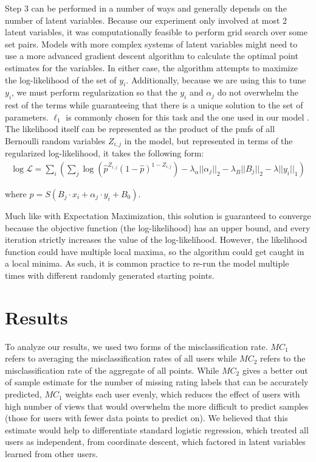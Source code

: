 \documentclass{article} %
\begin{document}
Step 3 can be performed in a number of ways and generally depends on the number of latent variables. Because our experiment only involved at most 2 latent variables, it was computationally feasible to perform grid search over some set pairs. Models with more complex systems of latent variables might need to use a more advanced gradient descent algorithm to calculate the optimal point estimates for the variables. In either case, the algorithm attempts to maximize the log-likelihood of the set of $y_i$. Additionally, because we are using this to tune $y_i$, we must perform regularization so that the $y_i$ and $\alpha_j$ do not overwhelm the rest of the terms while guaranteeing that there is a unique solution to the set of parameters. $\ell_1$ is commonly chosen for this task and the one used in our model \cite{mlapp}. The likelihood itself can be represented as the product of the pmfs of all Bernoulli random variables $Z_{i,j}$ in the model, but represented in terms of the regularized log-likelihood, it takes the following form:
\begin{align*}
\log \mathcal{L} = \sum_i \left( \sum_j \log(\hat{p}^{Z_{i,j}}(1-\hat{p})^{1-Z_{i,j}}) - \lambda_{\alpha} ||\alpha_j||_2 - \lambda_B ||B_j||_2 - \lambda ||y_i||_1 \right)
\end{align*}

where $\hat{p} = S(B_j \cdot x_i + \alpha_j \cdot y_i + B_0)$.

Much like with Expectation Maximization, this solution is guaranteed to converge because the objective function (the log-likelihood) has an upper bound, and every iteration strictly increases the value of the log-likelihood. However, the likelihood function could have multiple local maxima, so the algorithm could get caught in a local minima. As such, it is common practice to re-run the model multiple times with different randomly generated starting points.

\section{Results}

To analyze our results, we used two forms of the misclassification rate. $MC_1$ refers to averaging the misclassification rates of all users while $MC_2$ refers to the misclassification rate of the aggregate of all points. While $MC_2$ gives a better out of sample estimate for the number of missing rating labels that can be accurately predicted, $MC_1$ weights each user evenly, which reduces the effect of users with high number of views that would overwhelm the more difficult to predict samples (those for users with fewer data points to predict on). We believed that this estimate would help to differentiate standard logistic regression, which treated all users as independent, from coordinate descent, which factored in latent variables learned from other users.
\end{document}
